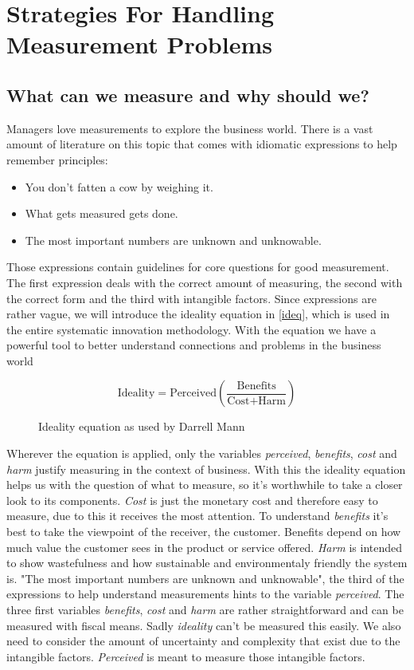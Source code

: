 \chapter{Strategies For Handling Measurement Problems}

\section{What can we measure and why should we?}

Managers love measurements to explore the business world.
There is a vast amount of literature on this topic that comes with idiomatic expressions to help remember principles:

\begin{itemize}
	\item You don't fatten a cow by weighing it.
	\item What gets measured gets done.
	\item The most important numbers are unknown and unknowable.
\end{itemize}

Those expressions contain guidelines for core questions for good measurement.
The first expression deals with the correct amount of measuring, the second with the correct form and the third with intangible factors.
Since expressions are rather vague, we will introduce the ideality equation in \autoref{ideq}, which is used in the entire systematic innovation methodology.
With the equation we have a powerful tool to better understand connections and problems in the business world 

\begin{figure}[h]
	\centering
	\begin{equation*}
		\text{Ideality} = \text{Perceived} \left(\frac{\text{Benefits}}{\text{Cost} + \text{Harm}}\right)
	\end{equation*}
	\caption{Ideality equation as used by Darrell Mann }
	\label{ideq}
\end{figure}

Wherever the equation is applied, only the variables \textit{perceived}, \textit{benefits}, \textit{cost} and \textit{harm} justify measuring in the context of business.
With this the ideality equation helps us with the question of what to measure, so it's worthwhile to take a closer look to its components.
\textit{Cost} is just the monetary cost and therefore easy to measure, due to this it receives the most attention.
To understand \textit{benefits} it's best to take the viewpoint of the receiver, the customer.
Benefits depend on how much value the customer sees in the product or service offered.
\textit{Harm} is intended to show wastefulness and how sustainable and environmentaly friendly the system is.
"The most important numbers are unknown and unknowable", the third of the expressions to help understand measurements hints to the variable \textit{perceived}.
The three first variables \textit{benefits}, \textit{cost} and \textit{harm} are rather straightforward and can be measured with fiscal means.
Sadly \textit{ideality} can't be measured this easily.
We also need to consider the amount of uncertainty and complexity that exist due to the intangible factors.
\textit{Perceived} is meant to measure those intangible factors.

